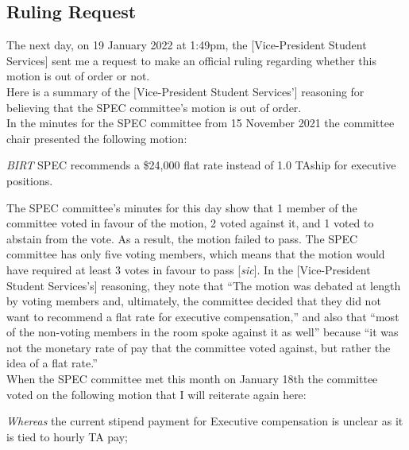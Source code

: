 \begin{multicols}{2}
\subsection*{Ruling Request}
\noindent The next day, on 19 January 2022 at 1:49pm, the [Vice-President Student Services] sent me a request to make an official ruling regarding whether this motion is out of order or not.\\
\noindent Here is a summary of the [Vice-President Student Services'] reasoning for believing that the SPEC committee’s motion is out of order.\\

In the minutes for the SPEC committee from 15 November 2021 the committee chair presented the following motion: \begin{small}\begin{center}\noindent\begin{minipage}{0.9\linewidth}
				\emph{BIRT} SPEC recommends a \$24,000 flat rate instead of 1.0 TAship for executive positions.
			\end{minipage}
		\end{center}
		\end{small}
The SPEC committee’s minutes for this day show that 1 member of the committee voted in favour of the motion, 2 voted against it, and 1 voted to abstain from the vote. As a result, the motion failed to pass. The SPEC committee has only five voting members, which means that the motion would have required at least 3 votes in favour to pass [\emph{sic}]. \newline
In the [Vice-President Student Services's] reasoning, they note that ``The motion was debated at length by voting members and, ultimately, the committee decided that they did not want to recommend a flat rate for executive compensation,'' and also that ``most of the non-voting members in the room spoke against it as well'' because ``it was not the monetary rate of pay that the committee voted against, but rather the idea of a flat rate.''\\
When the SPEC committee met this month on January 18th the committee voted on the following motion that I will reiterate again here:
	\begin{small}
		\begin{center}
			\noindent\begin{minipage}{0.8\linewidth}
				\emph{Whereas} the current stipend payment for Executive compensation is unclear as it is tied to hourly TA pay;\\

\end{minipage}
\end{center}
\end{small}
\end{multicols}
